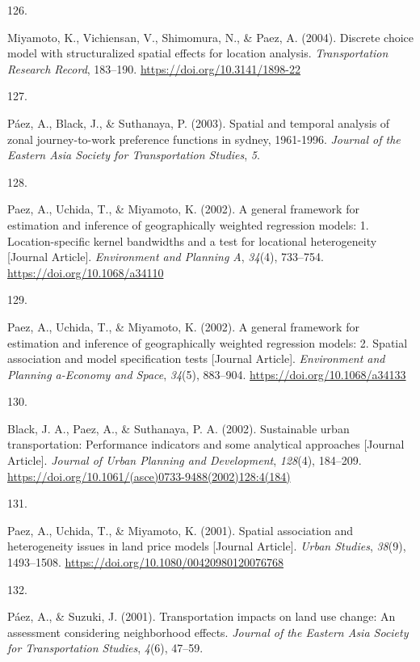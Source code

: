 \documentclass[11pt,a4paper,]{awesome-cv}
\newlength{\csllabelwidth}
\newcommand{\CSLLeftMargin}[1]{\parbox[t]{\csllabelwidth}{#1}}
\newcommand{\CSLRightInline}[1]{\parbox[t]{\linewidth - \csllabelwidth}{#1}}
\begin{document}
\leavevmode{}%
\CSLLeftMargin{126. }
\CSLRightInline{Miyamoto, K., Vichiensan, V., Shimomura, N., \& Paez, A.
(2004). Discrete choice model with structuralized spatial effects for
location analysis. \emph{Transportation Research Record}, 183--190.
\url{https://doi.org/10.3141/1898-22}}

\leavevmode{}%
\CSLLeftMargin{127. }
\CSLRightInline{Páez, A., Black, J., \& Suthanaya, P. (2003). Spatial
and temporal analysis of zonal journey-to-work preference functions in
sydney, 1961-1996. \emph{Journal of the Eastern Asia Society for
Transportation Studies}, \emph{5}.}

\leavevmode{}%
\CSLLeftMargin{128. }
\CSLRightInline{Paez, A., Uchida, T., \& Miyamoto, K. (2002). A general
framework for estimation and inference of geographically weighted
regression models: 1. Location-specific kernel bandwidths and a test for
locational heterogeneity {[}Journal Article{]}. \emph{Environment and
Planning A}, \emph{34}(4), 733--754.
\url{https://doi.org/10.1068/a34110}}

\leavevmode{}%
\CSLLeftMargin{129. }
\CSLRightInline{Paez, A., Uchida, T., \& Miyamoto, K. (2002). A general
framework for estimation and inference of geographically weighted
regression models: 2. Spatial association and model specification tests
{[}Journal Article{]}. \emph{Environment and Planning a-Economy and
Space}, \emph{34}(5), 883--904. \url{https://doi.org/10.1068/a34133}}

\leavevmode{}%
\CSLLeftMargin{130. }
\CSLRightInline{Black, J. A., Paez, A., \& Suthanaya, P. A. (2002).
Sustainable urban transportation: Performance indicators and some
analytical approaches {[}Journal Article{]}. \emph{Journal of Urban
Planning and Development}, \emph{128}(4), 184--209.
\url{https://doi.org/10.1061/(asce)0733-9488(2002)128:4(184)}}

\leavevmode{}%
\CSLLeftMargin{131. }
\CSLRightInline{Paez, A., Uchida, T., \& Miyamoto, K. (2001). Spatial
association and heterogeneity issues in land price models {[}Journal
Article{]}. \emph{Urban Studies}, \emph{38}(9), 1493--1508.
\url{https://doi.org/10.1080/00420980120076768}}

\leavevmode{}%
\CSLLeftMargin{132. }
\CSLRightInline{Páez, A., \& Suzuki, J. (2001). Transportation impacts
on land use change: An assessment considering neighborhood effects.
\emph{Journal of the Eastern Asia Society for Transportation Studies},
\emph{4}(6), 47--59.}
\end{document}

